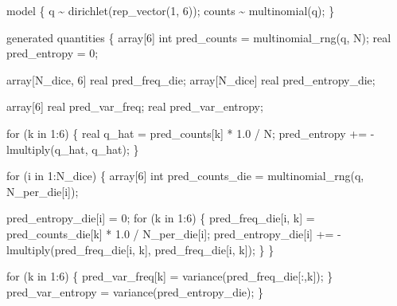 \documentclass[
  letterpaper,
  DIV=11,
  numbers=noendperiod]{scrartcl}
\newenvironment{Shaded}{\begin{snugshade}}{\end{snugshade}}
\newcommand{\ControlFlowTok}[1]{\textcolor[rgb]{0.00,0.23,0.31}{#1}}
\newcommand{\DataTypeTok}[1]{\textcolor[rgb]{0.68,0.00,0.00}{#1}}
\newcommand{\DecValTok}[1]{\textcolor[rgb]{0.68,0.00,0.00}{#1}}
\newcommand{\FloatTok}[1]{\textcolor[rgb]{0.68,0.00,0.00}{#1}}
\newcommand{\KeywordTok}[1]{\textcolor[rgb]{0.00,0.23,0.31}{#1}}
\newcommand{\NormalTok}[1]{\textcolor[rgb]{0.00,0.23,0.31}{#1}}
\begin{document}
\begin{codelisting}
\begin{Shaded}
\begin{Highlighting}[]
\KeywordTok{model}\NormalTok{ \{}
\NormalTok{  q \textasciitilde{} dirichlet(rep\_vector(}\DecValTok{1}\NormalTok{, }\DecValTok{6}\NormalTok{));}
\NormalTok{  counts \textasciitilde{} multinomial(q);}
\NormalTok{\}}

\KeywordTok{generated quantities}\NormalTok{ \{}
  \DataTypeTok{array}\NormalTok{[}\DecValTok{6}\NormalTok{] }\DataTypeTok{int}\NormalTok{ pred\_counts = multinomial\_rng(q, N);}
  \DataTypeTok{real}\NormalTok{ pred\_entropy = }\DecValTok{0}\NormalTok{;}

  \DataTypeTok{array}\NormalTok{[N\_dice, }\DecValTok{6}\NormalTok{] }\DataTypeTok{real}\NormalTok{ pred\_freq\_die;}
  \DataTypeTok{array}\NormalTok{[N\_dice] }\DataTypeTok{real}\NormalTok{ pred\_entropy\_die;}

  \DataTypeTok{array}\NormalTok{[}\DecValTok{6}\NormalTok{] }\DataTypeTok{real}\NormalTok{ pred\_var\_freq;}
  \DataTypeTok{real}\NormalTok{ pred\_var\_entropy;}

  \ControlFlowTok{for}\NormalTok{ (k }\ControlFlowTok{in} \DecValTok{1}\NormalTok{:}\DecValTok{6}\NormalTok{) \{}
    \DataTypeTok{real}\NormalTok{ q\_hat = pred\_counts[k] * }\FloatTok{1.0}\NormalTok{ / N;}
\NormalTok{    pred\_entropy += {-} lmultiply(q\_hat, q\_hat);}
\NormalTok{  \}}

  \ControlFlowTok{for}\NormalTok{ (i }\ControlFlowTok{in} \DecValTok{1}\NormalTok{:N\_dice) \{}
    \DataTypeTok{array}\NormalTok{[}\DecValTok{6}\NormalTok{] }\DataTypeTok{int}\NormalTok{ pred\_counts\_die = multinomial\_rng(q, N\_per\_die[i]);}

\NormalTok{    pred\_entropy\_die[i] = }\DecValTok{0}\NormalTok{;}
    \ControlFlowTok{for}\NormalTok{ (k }\ControlFlowTok{in} \DecValTok{1}\NormalTok{:}\DecValTok{6}\NormalTok{) \{}
\NormalTok{      pred\_freq\_die[i, k] = pred\_counts\_die[k] * }\FloatTok{1.0}\NormalTok{ / N\_per\_die[i];}
\NormalTok{      pred\_entropy\_die[i] += {-} lmultiply(pred\_freq\_die[i, k],}
\NormalTok{                                         pred\_freq\_die[i, k]);}
\NormalTok{    \}}
\NormalTok{  \}}

  \ControlFlowTok{for}\NormalTok{ (k }\ControlFlowTok{in} \DecValTok{1}\NormalTok{:}\DecValTok{6}\NormalTok{) \{}
\NormalTok{    pred\_var\_freq[k] = variance(pred\_freq\_die[:,k]);}
\NormalTok{  \}}
\NormalTok{  pred\_var\_entropy = variance(pred\_entropy\_die);}
\NormalTok{\}}
\end{Highlighting}
\end{Shaded}

\end{codelisting}
\end{document}
